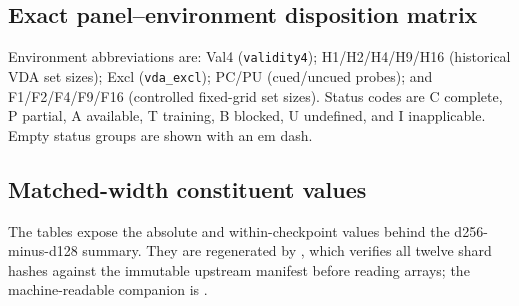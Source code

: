 \documentclass[11pt,a4paper]{article}
\newcommand{\env}[1]{\texttt{#1}}
\begin{document}
\begin{landscape}
\section{Exact panel--environment disposition matrix}
Environment abbreviations are: Val4 (\env{validity4}); H1/H2/H4/H9/H16 (historical VDA set sizes); Excl (\env{vda\_excl}); PC/PU (cued/uncued probes); and F1/F2/F4/F9/F16 (controlled fixed-grid set sizes). Status codes are C complete, P partial, A available, T training, B blocked, U undefined, and I inapplicable. Empty status groups are shown with an em dash.


\end{landscape}

\begin{landscape}
\section{Matched-width constituent values}\label{app:matched-width-constituents}
The tables expose the absolute and within-checkpoint values behind the d256-minus-d128 summary. They are regenerated by , which verifies all twelve shard hashes against the immutable upstream manifest before reading arrays; the machine-readable companion is .


\end{landscape}
\end{document}
